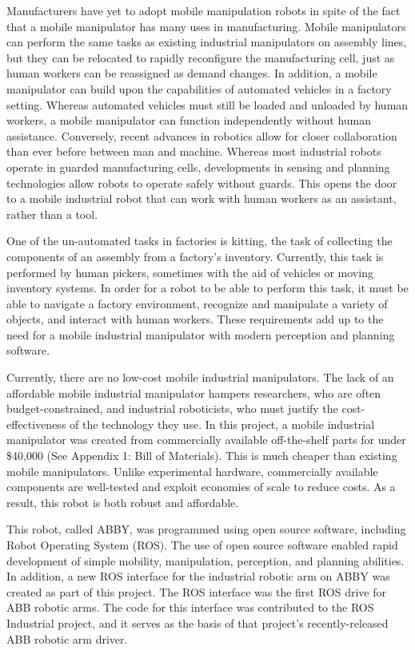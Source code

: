 \documentclass[]{cwru} %
\begin{document}
Manufacturers have yet to adopt mobile manipulation robots in spite of
the fact that a mobile manipulator has many uses in manufacturing.
Mobile manipulators can perform the same tasks as existing industrial
manipulators on assembly lines, but they can be relocated to rapidly
reconfigure the manufacturing cell, just as human workers can be
reassigned as demand changes. In addition, a mobile manipulator can
build upon the capabilities of automated vehicles in a factory setting.
Whereas automated vehicles must still be loaded and unloaded by human
workers, a mobile manipulator can function independently without human
assistance. Conversely, recent advances in robotics allow for closer
collaboration than ever before between man and machine. Whereas most
industrial robots operate in guarded manufacturing cells, developments
in sensing and planning technologies allow robots to operate safely
without guards. This opens the door to a mobile industrial robot that
can work with human workers as an assistant, rather than a tool.

One of the un-automated tasks in factories is kitting, the task of
collecting the components of an assembly from a factory's inventory.
Currently, this task is performed by human pickers, sometimes with the
aid of vehicles or moving inventory systems. In order for a robot to be
able to perform this task, it must be able to navigate a factory
environment, recognize and manipulate a variety of objects, and interact
with human workers. These requirements add up to the need for a mobile
industrial manipulator with modern perception and planning software.

Currently, there are no low-cost mobile industrial manipulators. The
lack of an affordable mobile industrial manipulator hampers researchers,
who are often budget-constrained, and industrial roboticists, who must
justify the cost-effectiveness of the technology they use. In this
project, a mobile industrial manipulator was created from commercially
available off-the-shelf parts for under \$40,000 (See Appendix 1: Bill
of Materials). This is much cheaper than existing mobile manipulators.
Unlike experimental hardware, commercially available components are
well-tested and exploit economies of scale to reduce costs. As a result,
this robot is both robust and affordable.

This robot, called ABBY, was programmed using open source software,
including Robot Operating System (ROS). The use of open source software
enabled rapid development of simple mobility, manipulation, perception,
and planning abilities. In addition, a new ROS interface for the
industrial robotic arm on ABBY was created as part of this project. The
ROS interface was the first ROS drive for ABB robotic arms. The code for
this interface was contributed to the ROS Industrial project, and it
serves as the basis of that project's recently-released ABB robotic arm
driver.
\end{document}
